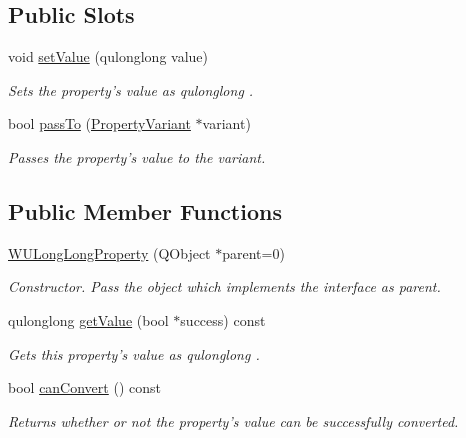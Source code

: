 \subsection*{Public Slots}
\begin{DoxyCompactItemize}
\item 
void \hyperlink{class_w_u_long_long_property_a88fb26420c3f7472f4499a7701ff9fc2}{set\-Value} (qulonglong value)
\begin{DoxyCompactList}\small\item\em Sets the property's value as qulonglong . \end{DoxyCompactList}\item 
bool \hyperlink{class_w_u_long_long_property_a080691c54190a03952b451b346541a86}{pass\-To} (\hyperlink{class_property_variant}{Property\-Variant} $\ast$variant)
\begin{DoxyCompactList}\small\item\em Passes the property's value to the variant. \end{DoxyCompactList}\end{DoxyCompactItemize}
\subsection*{Public Member Functions}
\begin{DoxyCompactItemize}
\item 
\hyperlink{class_w_u_long_long_property_a6f66a9a2fb1b6157a7dab9e721511235}{W\-U\-Long\-Long\-Property} (Q\-Object $\ast$parent=0)
\begin{DoxyCompactList}\small\item\em Constructor. Pass the object which implements the interface as parent. \end{DoxyCompactList}\item 
qulonglong \hyperlink{class_w_u_long_long_property_aca6d125f5a4cd021ba353c2afd5ca31d}{get\-Value} (bool $\ast$success) const 
\begin{DoxyCompactList}\small\item\em Gets this property's value as qulonglong . \end{DoxyCompactList}\item 
bool \hyperlink{class_w_u_long_long_property_a35c48d980e5e28944a9521e80e89e592}{can\-Convert} () const 
\begin{DoxyCompactList}\small\item\em Returns whether or not the property's value can be successfully converted. \end{DoxyCompactList}\end{DoxyCompactItemize}
